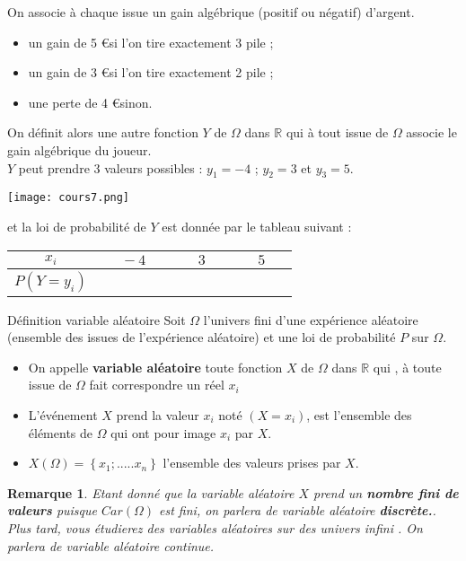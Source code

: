 \documentclass[10pt,a4paper]{article}
\theoremstyle{break}
\newtheorem{Rem}{Remarque}
\begin{document}
On associe à chaque issue un gain \og algébrique \fg{} (positif ou négatif) d'argent.
\begin{itemize}
	\item un gain de 5 \euro si l'on tire exactement 3 \og pile \fg{} ;
	\item un gain de 3 \euro si l'on tire exactement 2 \og pile \fg{} ;
	\item une perte de 4 \euro sinon.
\end{itemize}
On définit alors une autre fonction $Y$ de $\Omega$ dans $\mathbb{R}$ qui à tout issue de $\Omega$ associe le gain algébrique du joueur.\\
$Y$ peut prendre 3 valeurs possibles : $y_1=-4$ ; $y_2=3$ et $y_3=5$.
\begin{center}
	\texttt{[image: cours7.png]} 
\end{center}
et la loi de probabilité de $Y$ est donnée par le tableau suivant :
\begin{center}
	\begin{tabular}{|c|c|c|c|}
		\hline
		$\text{~~~~}x_{i}\text{~~~~}$&$\text{~~~~}-4\text{~~~~}$&$\text{~~~~}3\text{~~~~}$&$\text{~~~~}5\text{~~~~}$\\
		\hline
		$P(Y=y_{i})$&&&\\
		\hline
	\end{tabular}
\end{center}
	\begin{bclogo}[couleur = yellow!30, arrondi = 0.1,logo=\bcbook]{Définition variable aléatoire}
	Soit $\Omega$ l'univers fini d'une expérience aléatoire (ensemble des issues de l'expérience aléatoire) et une loi de probabilité $P$ sur $\Omega$.
	\begin{itemize}
		\item On appelle  \textbf{variable aléatoire} toute fonction $X$ de $\Omega$  dans $\mathbb{R}$ qui , à toute issue de $\Omega$ fait correspondre un réel $x_i$
		\item L'événement \og $X$ prend la valeur $x_{i}$ \fg{} noté $(X=x_{i})$, est l'ensemble des éléments de $\Omega$ qui ont pour image $x_i$ par $X$.
		\item $X(\Omega)=\left\lbrace x_{1} ; ..... x_{n}\right\rbrace $ l'ensemble des valeurs prises par $X$.\\
	\end{itemize}
		\end{bclogo}
	\begin{Rem}
		Etant donné que la variable aléatoire $X$ prend un \textbf{nombre fini de valeurs} puisque $Car(\Omega)$ est fini, on parlera de variable aléatoire \textbf{discrète.}.\\
		Plus tard, vous étudierez des variables aléatoires sur des univers infini . On parlera de variable aléatoire continue.
	\end{Rem}
\end{document}
